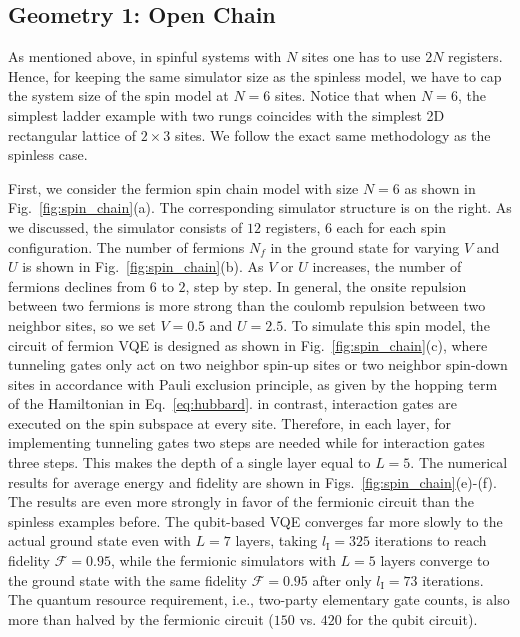 \documentclass[aps, pra, reprint, superscriptaddress]{revtex4-1}
\begin{document}
\subsection{Geometry 1: Open Chain}
\label{subsec:spinful_open}
As mentioned above, in spinful systems with $N$ sites  one has to use $2N$  registers.  
Hence, for keeping the same simulator size as the spinless model, we have to cap the system size of the spin model at $N{=}6$ sites. Notice that when $N{=}6$, the simplest ladder example with two rungs coincides with the simplest 2D rectangular lattice of $2 {\times} 3 $ sites. We follow the exact same methodology as the spinless case. 


First, we consider the fermion spin chain model with size $N{=}6$ as shown in Fig.~\ref{fig:spin_chain}(a). The corresponding simulator structure is on the right. As we discussed, the simulator consists of $12$ registers, $6$ each for each spin configuration.  The number of fermions $N_f$ in the ground state for varying $V$ and $U$ is shown in Fig.~\ref{fig:spin_chain}(b). As $V$ or $U$ increases, the number of fermions declines from $6$ to $2$, step by step. In general, the onsite repulsion between two fermions is more strong than the coulomb repulsion between two neighbor sites, so we set $V{=}0.5$ and $U{=}2.5$. To simulate this spin model, the circuit of fermion VQE is designed as shown in Fig.~\ref{fig:spin_chain}(c), where tunneling gates only act on two neighbor spin-up sites or two neighbor spin-down sites in accordance with Pauli exclusion principle, as given by the hopping term of the Hamiltonian in Eq.~\eqref{eq:hubbard}.  in contrast, interaction gates are executed on the spin subspace at every site. Therefore, 
in each layer, for implementing tunneling gates two steps are needed while for interaction gates three steps. This makes the depth of a single layer equal to $L{=}5$. 
The numerical results for average energy and fidelity are shown in Figs.~\ref{fig:spin_chain}(e)-(f). The results are even more strongly  in favor of the fermionic circuit than the spinless examples before. The qubit-based VQE converges far more slowly to the actual ground state even with $L{=}7$ layers, taking $l_\text{I}{=}325$ iterations to reach fidelity $\mathcal{F}{=}0.95$, while the fermionic simulators with $L{=}5$ layers converge to the ground state with the same fidelity $\mathcal{F}{=}0.95$ after only $l_\text{I}{=}73$ iterations. The quantum resource requirement, i.e., two-party elementary gate counts, is also more than halved by the fermionic circuit ($150$ vs. $420$ for the qubit circuit). 
\end{document}
